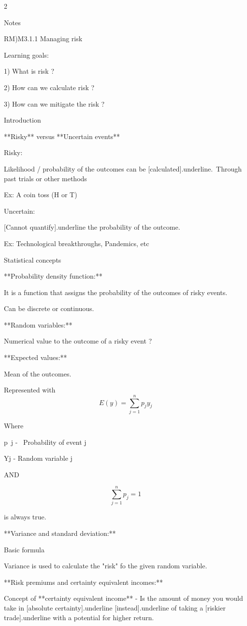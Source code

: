 \documentclass{article}
\begin{document}
\begin{multicols}{2}


    
Notes

RM)M3.1.1 Managing risk

Learning goals:

1)  What is risk ?

2)  How can we calculate risk ?

3)  How can we mitigate the risk ?

Introduction

**Risky** versus **Uncertain events**

Risky:

Likelihood / probability of the outcomes can be [calculated]{.underline}.\
Through past trials or other methods

Ex: A coin toss (H or T)

Uncertain:

[Cannot quantify]{.underline} the probability of the outcome.

Ex: Technological breakthroughs, Pandemics, etc

Statistical concepts

**Probability density function:**

It is a function that assigns the probability of the outcomes of risky events.

Can be discrete or continuous.

**Random variables:**

Numerical value to the outcome of a risky event ?

**Expected values:**

Mean of the outcomes.

Represented with$$
E(y)=\sum_{j=1}^n p_j y_j 
$$

Where

\space p~j -~ Probability of event j

\space Yj - Random variable j

AND

$$
\sum_{j=1}^n p_j = 1$$

is always true.

**Variance and standard deviation:**

Basic formula


Variance is used to calculate the "risk" fo the given random variable.

**Risk premiums and certainty equivalent incomes:**

Concept of **certainty equivalent income** - Is the amount of money you would take in [absolute certainty]{.underline} [instead]{.underline} of taking a [riskier trade]{.underline} with a potential for higher return.


\end{multicols}
\end{document}
